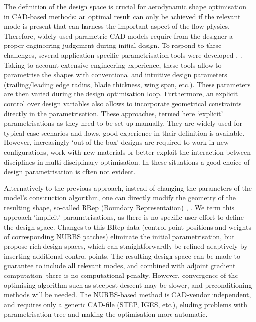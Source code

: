 \documentclass[9pt,academicons]{article}
\begin{document}
The definition of the design space is crucial for aerodynamic shape optimisation in CAD-based methods:  
an optimal result can only be achieved if
the relevant mode is present that can harness the important
aspect of the 
flow physics. Therefore, widely used parametric CAD models require from the designer a proper engineering judgement during initial design. To respond to these challenges, several application-specific parametrisation tools were developed \cite{grasel2004parblading}, \cite{verstreate2010cado}. Taking to account extensive engineering experience, these tools allow to parametrise the shapes with conventional and intuitive design parameters (trailing/leading edge radius, blade thickness, wing span, etc.). These parameters are then varied during the design optimisation loop. Furthermore, an explicit control over design variables also allows to incorporate geometrical constraints directly in the parametrisation.
%
These approaches, termed here `explicit' parametrisations as they need to be set up manually.
They are widely used for typical case scenarios and flows, good experience in their 
definition is available. However, increasingly `out of the box' designs are required 
to work in new configurations, work with new materials or better exploit the 
interaction between disciplines in multi-disciplinary optimisation. In these situations
a good choice of design parametrisation is often not evident. 

Alternatively to the previous approach, instead of changing the parameters of the model's construction algorithm, one can directly modify the geometry of the resulting shape, so-called BRep (Boundary Representation) \cite{xu13:cad-based}, \cite{xu15cad-based}.
%
We term this approach `implicit' parametrisations, as there is no specific user
effort to define the design space.
%
 Changes to this BRep data (control point positions and weights of corresponding NURBS 
patches) 
eliminate the initial parametrisation, but propose rich design spaces, which 
can straightforwardly be 
refined 
adaptively 
by inserting additional control points. 
The resulting design space can be made to guarantee to include all relevant 
modes, and combined with adjoint gradient computation, there is no computational
penalty. However, convergence of the optimising algorithm such as steepest descent
may be slower, and preconditioning methods will be needed.
The NURBS-based method is CAD-vendor independent, and requires only a generic CAD-file (STEP, IGES, etc.), eluding problems with parametrisation tree and making the optimisation more automatic.
\end{document}
